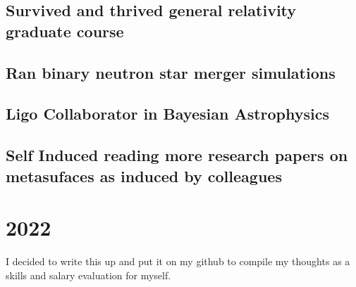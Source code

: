 \documentclass{article}
\begin{document}
\subsection{Survived and thrived general relativity graduate course }
\subsection{Ran binary neutron star merger simulations}
\subsection{Ligo Collaborator in Bayesian Astrophysics}
\subsection{Self Induced reading more research papers on metasufaces as induced by colleagues}

\section{2022}
I decided to write this up and put it on my github to compile my thoughts as a skills and salary evaluation for myself. 
\end{document}
